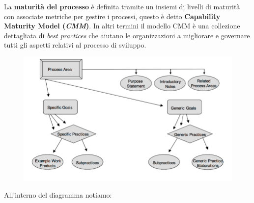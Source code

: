 La \textbf{maturità del processo} è definita tramite un insiemi di livelli di maturità con associate metriche per gestire i processi, questo è detto \textbf{Capability Maturity Model (\textit{CMM})}. In altri termini il modello CMM è una collezione dettagliata di \textit{best practices} che aiutano le organizzazioni a migliorare e governare tutti gli aspetti relativi al processo di sviluppo.
\begin{figure}[H]
    \centering
    \includegraphics[scale = 0.4]{Imm/CMMI-Dev-Model-components-in-Tea10.png}
    \label{fig:my_label}
\end{figure}
All'interno del diagramma notiamo: 
